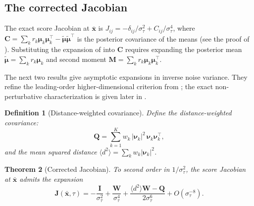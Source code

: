 \documentclass[11pt]{article}
\newtheorem{theorem}{Theorem}[section]
\newtheorem{definition}[theorem]{Definition}
\begin{document}
\subsection{The corrected Jacobian}\label{sec:corr:jacobian}

The exact score Jacobian at $\bar{\bm{x}}$ is $J_{ij} = -\delta_{ij}/\sigma_\tau^2 + C_{ij}/\sigma_\tau^4$, where $\bm{C} = \sum_k r_k \bm{\mu}_k\bm{\mu}_k^\top - \tilde{\bm{\mu}}\tilde{\bm{\mu}}^\top$ is the posterior covariance of the means (see the proof of ).
Substituting the expansion of  into $\bm{C}$ requires expanding the posterior mean $\tilde{\bm{\mu}} = \sum_k r_k \bm{\mu}_k$ and second moment $\bm{M} = \sum_k r_k \bm{\mu}_k\bm{\mu}_k^\top$.

The next two results give asymptotic expansions in inverse noise variance. They refine the leading-order higher-dimensional criterion from ; the exact non-perturbative characterization is given later in .

\begin{definition}[Distance-weighted covariance]\label{def:Q}
Define the \emph{distance-weighted covariance}:
\begin{equation}\label{eq:Q-def}
  \bm{Q} = \sum_{k=1}^K w_k\,|\bm{\nu}_k|^2\,\bm{\nu}_k\bm{\nu}_k^\top,
\end{equation}
and the mean squared distance $\langle d^2\rangle = \sum_k w_k |\bm{\nu}_k|^2$.
\end{definition}

\begin{theorem}[Corrected Jacobian]\label{thm:corrected-jacobian}
To second order in $1/\sigma_\tau^2$, the score Jacobian at $\bar{\bm{x}}$ admits the expansion
\begin{equation}\label{eq:corrected-jacobian}
  \bm{J}(\bar{\bm{x}},\tau)
  = -\frac{\bm{I}}{\sigma_\tau^2}
  + \frac{\bm{W}}{\sigma_\tau^4}
  + \frac{\langle d^2\rangle\bm{W} - \bm{Q}}{2\sigma_\tau^6}
  + O(\sigma_\tau^{-8}).
\end{equation}
\end{theorem}
\end{document}
